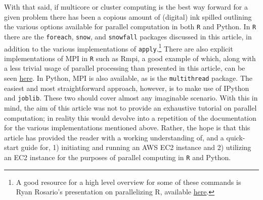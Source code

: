 \documentclass[12pt, letterpaper]{article}
\begin{document}
With that said, if multicore or cluster computing is the best way forward for 
a given problem there has been a copious amount of (digital) ink spilled 
outlining the various options available for parallel computation in both \texttt{R} and 
Python. In \texttt{R} there are the \texttt{foreach}, \texttt{snow}, and \texttt{snowfall} 
packages discussed in this article, in addition to the various implementations of 
\texttt{apply}.\footnote{A good resource for a high level overview
for some of these commands is Ryan Rosario's presentation on parallelizing R, available  
\href{http://www.slideshare.net/bytemining/taking-r-to-the-limit-high-performance-computing-in-r-part-1-parallelization-la-r-users-group-727}
{here}.} 
There are also explicit implementations of MPI in \texttt{R} such as Rmpi, a good example of which, 
along with a less trivial usage of parallel processing
than presented in this article, can be seen \href{http://math.acadiau.ca/ACMMaC/Rmpi/examples.html}{here}. 
In Python, MPI is also available, as is the 
\texttt{multithread} package. The easiest and most straightforward approach, 
however, is to make use of IPython and \texttt{joblib}. These two should cover 
almost any imaginable scenario. With this in mind, the aim of this article was not to provide an 
exhaustive tutorial on parallel computation; in reality this would devolve into 
a repetition of the documentation for the various implementations mentioned 
above. Rather, the hope is that this article has provided the reader with
a working understanding of, and a quick-start guide for, 1) initiating 
and running an AWS EC2 instance and 2) utilizing an EC2 
instance for the purposes of parallel computing in \texttt{R} and Python. 
 



\newpage



\end{document}
